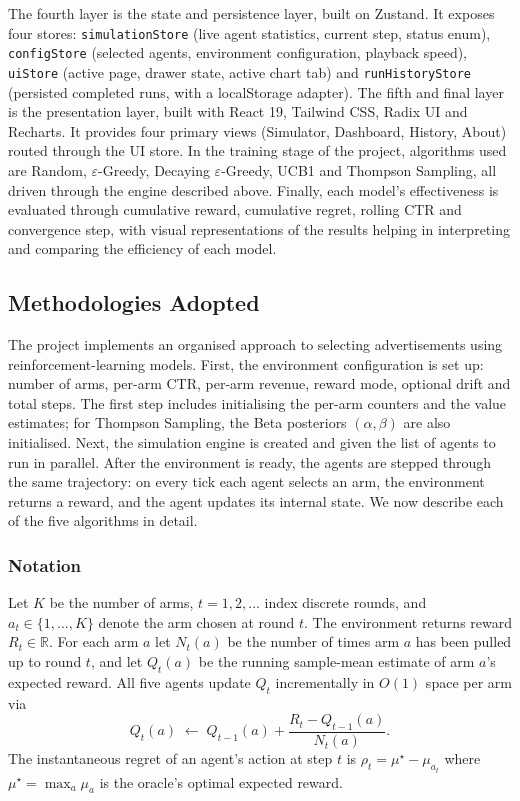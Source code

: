 The fourth layer is the state and persistence layer, built on Zustand. It exposes four stores: \texttt{simulationStore} (live agent statistics, current step, status enum), \texttt{configStore} (selected agents, environment configuration, playback speed), \texttt{uiStore} (active page, drawer state, active chart tab) and \texttt{runHistoryStore} (persisted completed runs, with a localStorage adapter). The fifth and final layer is the presentation layer, built with React 19, Tailwind CSS, Radix UI and Recharts. It provides four primary views (Simulator, Dashboard, History, About) routed through the UI store. In the training stage of the project, algorithms used are Random, $\varepsilon$-Greedy, Decaying $\varepsilon$-Greedy, UCB1 and Thompson Sampling, all driven through the engine described above. Finally, each model's effectiveness is evaluated through cumulative reward, cumulative regret, rolling CTR and convergence step, with visual representations of the results helping in interpreting and comparing the efficiency of each model.

\subsection{Methodologies Adopted}
The project implements an organised approach to selecting advertisements using reinforcement-learning models. First, the environment configuration is set up: number of arms, per-arm CTR, per-arm revenue, reward mode, optional drift and total steps. The first step includes initialising the per-arm counters and the value estimates; for Thompson Sampling, the Beta posteriors $(\alpha, \beta)$ are also initialised. Next, the simulation engine is created and given the list of agents to run in parallel. After the environment is ready, the agents are stepped through the same trajectory: on every tick each agent selects an arm, the environment returns a reward, and the agent updates its internal state. We now describe each of the five algorithms in detail.

\subsubsection*{Notation}
Let $K$ be the number of arms, $t = 1, 2, \ldots$ index discrete rounds, and $a_t \in \{1,\ldots,K\}$ denote the arm chosen at round $t$. The environment returns reward $R_t \in \mathbb{R}$. For each arm $a$ let $N_t(a)$ be the number of times arm $a$ has been pulled up to round $t$, and let $Q_t(a)$ be the running sample-mean estimate of arm $a$'s expected reward. All five agents update $Q_t$ incrementally in $O(1)$ space per arm via
\begin{equation}
Q_t(a) \;\leftarrow\; Q_{t-1}(a) + \frac{R_t - Q_{t-1}(a)}{N_t(a)}.
\label{eq:Qincr}
\end{equation}
The instantaneous regret of an agent's action at step $t$ is $\rho_t = \mu^\star - \mu_{a_t}$ where $\mu^\star = \max_a \mu_a$ is the oracle's optimal expected reward.

